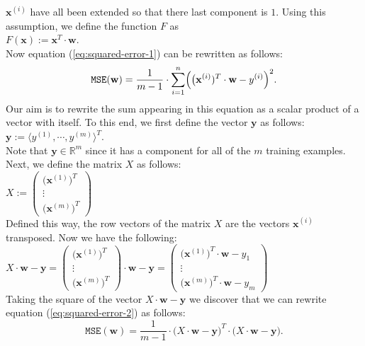 $\mathbf{x}^{(i)}$ have all been extended so that there last component is $1$.  Using this
assumption,  we define the
function $F$ as
\\[0.2cm]
\hspace*{1.3cm}
$F(\mathbf{x}) := \mathbf{x}^T \cdot \mathbf{w}$.
\\[0.2cm]
Now equation (\ref{eq:squared-error-1}) can be rewritten as follows:
\begin{equation}
  \label{eq:squared-error-2}
  \mathtt{MSE}(\mathbf{w}) = \frac{1}{m-1} \cdot \sum\limits_{i=1}^n \Bigl(\bigl(\mathbf{x}^{(i)})^T \cdot \mathbf{w}  - y^{(i)}\Bigr)^2.
\end{equation}
Our aim is to rewrite the sum appearing in this equation as a scalar product of a vector with
itself.  To this end, we first define the vector $\mathbf{y}$ as follows:
\\[0.2cm]
\hspace*{1.3cm}
$\mathbf{y} := \langle y^{(1)}, \cdots, y^{(m)} \rangle^T$.
\\[0.2cm]
Note that $\mathbf{y} \in \mathbb{R}^m$ since it has a component for all of the $m$ training
examples.  Next, we define the matrix $X$ as follows:
\\[0.2cm]
\hspace*{1.3cm}
$X := \left(
  \begin{array}{c}
    \bigl(\mathbf{x}^{(1)}\bigr)^T  \\
    \vdots                         \\
    \bigl(\mathbf{x}^{(m)}\bigr)^T
  \end{array}
  \right)   
$
\\[0.2cm]
Defined this way, the row vectors of the matrix $X$ are the vectors $\mathbf{x}^{(i)}$ transposed.
Now we have the following:
\\[0.2cm]
\hspace*{1.3cm}
$X \cdot \mathbf{w} - \mathbf{y} = \left(
  \begin{array}{c}
    \bigl(\mathbf{x}^{(1)}\bigr)^T  \\
    \vdots                         \\
    \bigl(\mathbf{x}^{(m)}\bigr)^T
  \end{array}
  \right) \cdot \mathbf{w} - \mathbf{y} = \left(
  \begin{array}{c}
    \bigl(\mathbf{x}^{(1)}\bigr)^T \cdot \mathbf{w} - y_1 \\
    \vdots                         \\
    \bigl(\mathbf{x}^{(m)}\bigr)^T \cdot \mathbf{w} - y_m
  \end{array}
  \right)
$
\\[0.2cm]
Taking the square of the vector $X \cdot \mathbf{w} - \mathbf{y}$ we discover that
we can rewrite equation (\ref{eq:squared-error-2}) as follows:
\begin{equation}
  \label{eq:squared-error-3}
  \mathtt{MSE}(\mathbf{w}) = \frac{1}{m-1} \cdot \bigl(X \cdot \mathbf{w} - \textbf{y}\bigr)^T \cdot 
                                            \bigl(X \cdot \mathbf{w} - \textbf{y}\bigr).
\end{equation}

